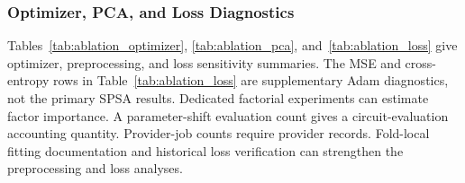 \begin{table}[H]
  \centering
  \caption{Supplementary encoding diagnostic (Breast Cancer, $n=8$, $L=2$, Adam)}
  \label{tab:ablation_encoding}
  \small
  \setlength{\tabcolsep}{4pt}
\end{table}
\FloatBarrier

\begin{table}[H]
  \centering
  \caption{Supplementary ansatz-depth diagnostic (Breast Cancer, $n=8$, angle, Adam, $\epsilon_{2q}=10^{-2}$)}
  \label{tab:ablation_depth}
  \small
  \setlength{\tabcolsep}{4pt}
\end{table}
\FloatBarrier

\subsubsection{Optimizer, PCA, and Loss Diagnostics}

Tables~\ref{tab:ablation_optimizer}, \ref{tab:ablation_pca}, and~\ref{tab:ablation_loss} give optimizer, preprocessing, and loss sensitivity summaries. The MSE and cross-entropy rows in Table~\ref{tab:ablation_loss} are supplementary Adam diagnostics, not the primary SPSA results. Dedicated factorial experiments can estimate factor importance. A parameter-shift evaluation count gives a circuit-evaluation accounting quantity. Provider-job counts require provider records. Fold-local fitting documentation and historical loss verification can strengthen the preprocessing and loss analyses.


